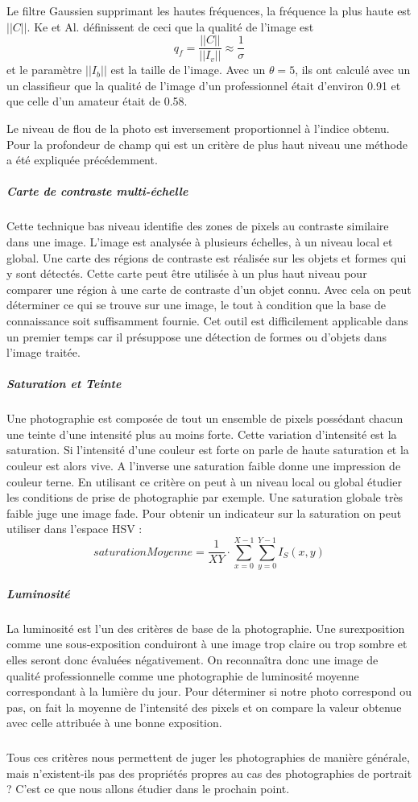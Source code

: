 \documentclass[11pt, french]{report-rd-info}
\begin{document}
Le filtre Gaussien supprimant les hautes fréquences, la fréquence la plus haute est $||C||$. Ke et Al. définissent de ceci que la qualité de l'image est 
\begin{equation}
q_f = \frac{||C||}{||I_v||} \approx \frac{1}{\sigma}
\end{equation}
et le paramètre $||I_b||$ est la taille de l'image. Avec un $\theta = 5$, ils ont calculé avec un un classifieur que la qualité de l'image d'un professionnel était d'environ 0.91 et que celle d'un amateur était de 0.58.

Le niveau de flou de la photo est inversement proportionnel à l’indice obtenu. Pour la profondeur de champ qui est un critère de plus haut niveau une méthode a été expliquée précédemment.

\subparagraph{Carte de contraste multi-échelle}
Cette technique bas niveau identifie des zones de pixels au contraste similaire dans une image. L’image est analysée à plusieurs échelles, à un niveau local et global. Une carte des régions de contraste est réalisée sur les objets et formes qui y sont détectés. Cette carte peut être utilisée à un plus haut niveau pour comparer une région à une carte de contraste d’un objet connu. Avec cela on peut déterminer ce qui se trouve sur une image, le tout à condition que la base de connaissance soit suffisamment fournie. Cet outil est difficilement applicable dans un premier temps car il présuppose une détection de formes ou d’objets dans l’image traitée.
\subparagraph{Saturation et Teinte}
Une photographie est composée de tout un ensemble de pixels possédant chacun une teinte d’une intensité plus au moins forte. Cette variation d’intensité est la saturation. Si l’intensité d’une couleur est forte on parle de haute saturation et la couleur est alors vive. A l’inverse une saturation faible donne une impression de couleur terne. En utilisant ce critère on peut à un niveau local ou global étudier les conditions de prise de photographie par exemple. Une saturation globale très faible juge une image fade. Pour obtenir un indicateur sur la saturation on peut utiliser dans l'espace HSV : 
\begin{equation}
saturationMoyenne = \frac{1}{XY}\cdot \sum_{x=0}^{X-1} \sum_{y=0}^{Y-1} I_S(x,y)  
\end{equation}

\subparagraph{Luminosité}
La luminosité est l’un des critères de base de la photographie. Une surexposition  comme une sous-exposition conduiront à une image trop claire ou trop sombre et elles seront donc évaluées négativement. On reconnaîtra donc une image de qualité professionnelle comme une photographie de luminosité moyenne correspondant à la lumière du jour. Pour déterminer si notre photo correspond ou pas, on fait la moyenne de l’intensité des pixels et on compare la valeur obtenue avec celle attribuée à une bonne exposition.
\subparagraph{}
Tous ces critères nous permettent de juger les photographies de manière générale, mais n'existent-ils pas des propriétés propres au cas des photographies de portrait ? C'est ce que nous allons étudier dans le prochain point.
\end{document}
